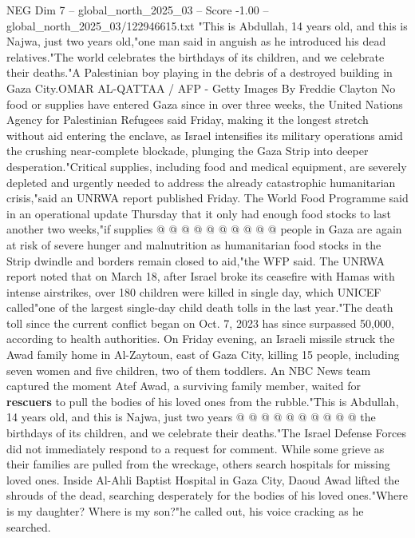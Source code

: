 \begin{textsample}{NEG Dim 7 – global\_north\_2025\_03 – Score -1.00 – global\_north\_2025\_03/122946615.txt}  \label{ex:f7_neg_131}
"This is Abdullah, 14 years old, and this is Najwa, just two years old,"one man said in anguish as he introduced his dead relatives."The world celebrates the birthdays of its children, and we celebrate their deaths."A Palestinian boy playing in the debris of a destroyed building in Gaza City.OMAR AL-QATTAA / AFP - Getty Images By Freddie Clayton No food or supplies have entered Gaza since in over three weeks, the United Nations Agency for Palestinian Refugees said Friday, making it the longest stretch without aid entering the enclave, as Israel intensifies its military operations amid the crushing near-complete blockade, plunging the Gaza Strip into deeper desperation."Critical supplies, including food and medical equipment, are severely depleted and urgently needed to address the already catastrophic humanitarian crisis,"said an UNRWA report published Friday.
The World Food Programme said in an operational update Thursday that it only had enough food stocks to last another two weeks,"if supplies @ @ @ @ @ @ @ @ @ @ people in Gaza are again at risk of severe hunger and malnutrition as humanitarian food stocks in the Strip dwindle and borders remain closed to aid,"the WFP said.
The UNRWA report noted that on March 18, after Israel broke its ceasefire with Hamas with intense airstrikes, over 180 children were killed in single day, which UNICEF called"one of the largest single-day child death tolls in the last year."The death toll since the current conflict began on Oct. 7, 2023 has since surpassed 50,000, according to health authorities.
On Friday evening, an Israeli missile struck the Awad family home in Al-Zaytoun, east of Gaza City, killing 15 people, including seven women and five children, two of them toddlers.
An NBC News team captured the moment Atef Awad, a surviving family member, waited for \textbf{rescuers} to pull the bodies of his loved ones from the rubble."This is Abdullah, 14 years old, and this is Najwa, just two years @ @ @ @ @ @ @ @ @ @ the birthdays of its children, and we celebrate their deaths."The Israel Defense Forces did not immediately respond to a request for comment.
While some grieve as their families are pulled from the wreckage, others search hospitals for missing loved ones.
Inside Al-Ahli Baptist Hospital in Gaza City, Daoud Awad lifted the shrouds of the dead, searching desperately for the bodies of his loved ones."Where is my daughter?
Where is my son?"he called out, his voice cracking as he searched.

\end{textsample}
